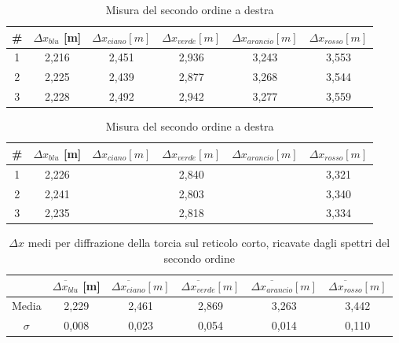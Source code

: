 \documentclass{article}
\begin{document}
\begin{table}[h]
    \centering
    \begin{tabular}{||c|c|c|c|c|c||}
        \hline
        \# & \cellcolor{blue}$\Delta x_{blu}$ [m] & \cellcolor{cyan}$\Delta x_{ciano}[m]$ & \cellcolor{green}$\Delta x_{verde}[m]$ & \cellcolor{orange}$\Delta x_{arancio}[m]$ & \cellcolor{red}$\Delta x_{rosso}[m]$ \\
        \hline
        1 & 2,216 & 2,451 & 2,936 & 3,243 & 3,553 \\
        2 & 2,225 & 2,439 & 2,877 & 3,268 & 3,544 \\
        3 & 2,228 & 2,492 & 2,942 & 3,277 & 3,559 \\
        \hline
    \end{tabular}
    \caption{Misura del secondo ordine a sinistra}
\centering
\begin{tabular}{||c|c|c|c|c|c||}
    \hline
    \# & \cellcolor{blue}$\Delta x_{blu}$ [m] & \cellcolor{cyan}$\Delta x_{ciano}[m]$ & \cellcolor{green}$\Delta x_{verde}[m]$ & \cellcolor{orange}$\Delta x_{arancio}[m]$ & \cellcolor{red}$\Delta x_{rosso}[m]$ \\
    \hline
    1 & 2,226 & & 2,840 & & 3,321 \\
    2 & 2,241 & & 2,803 & & 3,340 \\
    3 & 2,235 & & 2,818 & & 3,334 \\
    \hline
\end{tabular}
\caption{Misura del secondo ordine a destra}
\end{table}

\begin{table}[h]
    \centering
\begin{tabular}{||c|c|c|c|c|c||}
    \hline
     & \cellcolor{blue}$\overline{\Delta x_{blu}}$ [m] & \cellcolor{cyan}$\overline{\Delta x_{ciano}} [m]$ & \cellcolor{green}$\overline{\Delta x_{verde}}[m]$ & \cellcolor{orange}$\overline{\Delta x_{arancio}}[m]$ & \cellcolor{red}$\overline{\Delta x_{rosso}}[m]$ \\
    \hline
    Media & 2,229 & 2,461 & 2,869 & 3,263 & 3,442 \\
    $\sigma$ & 0,008 & 0,023 & 0,054 & 0,014 & 0,110 \\
    \hline
\end{tabular}
\caption{$\Delta x$ medi per diffrazione della torcia sul reticolo corto, ricavate dagli spettri del secondo ordine}
\end{table}
\end{document}
